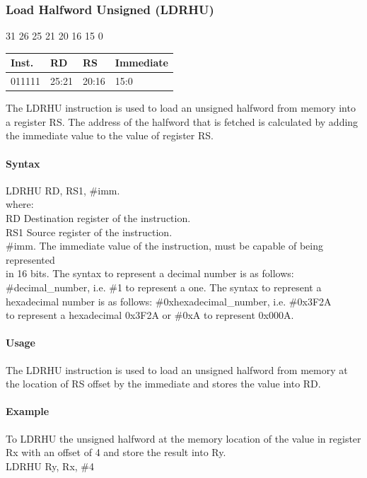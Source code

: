 \documentclass[12pt]{article}
\newcommand{\iTypeInstruction}[6]
{%
    \hspace{1.6cm}31 \hspace{1.15cm}26 \hspace{.05cm}25 \hspace{.8cm}21 \hspace{.05cm}20 \hspace{.8cm}16 \hspace{.05cm}15 \hspace{6.4cm}0
    \vspace{-.25cm}
    \begin{center}
        \begin{tabular}{ |p{1.8cm}|p{1.5cm}|p{1.5cm}|p{6.8cm}| }
            \hline
            \textbf{Inst.} & \textbf{RD} &  \textbf{RS} & \textbf{Immediate}\\
            \hline
            #1 & 25:21 & 20:16 &15:0\\
            \hline
        \end{tabular}
    \end{center}
    
    \noindent
    #2
    
    \paragraph{Syntax}
    \begin{flushleft}
    #3 RD, RS1, \#imm.\\
    \vspace{1em}        %
    where:\\
    \vspace{1em}
    RD  \hspace{3.6em} Destination register of the instruction.\\
    \vspace{1em}
    RS1  \hspace{3.35em} Source register of the instruction.\\
    \vspace{1em}
    \#imm.  \hspace{1.8em} The immediate value of the instruction, must be capable of being represented\\             \hspace{5.4em} in 16 bits. The syntax to represent a decimal number is as follows:\\
            \hspace{5.4em} \#decimal\_number, i.e. \#1 to represent a one. The syntax to represent a\\
            \hspace{5.4em} hexadecimal number is as follows: \#0xhexadecimal\_number, i.e. \#0x3F2A \\
            \hspace{5.4em} to represent a hexadecimal 0x3F2A or \#0xA to represent 0x000A.\\
    \end{flushleft}
    
    \paragraph{Usage}
    \begin{flushleft}
    #4\\
    \end{flushleft}
    \paragraph{Example}
    \begin{flushleft}
    #5\\
    \vspace{1em}
    #6
    \end{flushleft}}
\begin{document}

    \newpage
    \subsubsection{Load Halfword Unsigned (LDRHU)}
    
    \iTypeInstruction
    {011111}
    {The LDRHU instruction is used to load an unsigned halfword from memory into a register RS. The address of the halfword that is fetched is calculated by adding the immediate value to the value of register RS.}
    {LDRHU}
    {The LDRHU instruction is used to load an unsigned halfword from memory at the location of RS offset by the immediate and stores the value into RD.}
    {To LDRHU the unsigned halfword at the memory location of the value in register Rx with an offset of 4 and store the result into Ry.}
    {LDRHU Ry, Rx, \#4}
    
    
    
\end{document}
